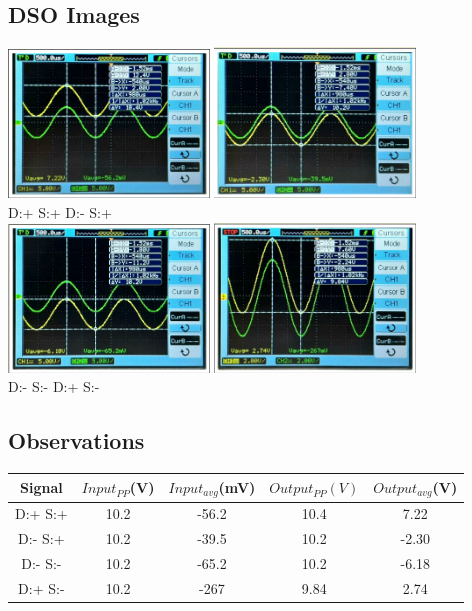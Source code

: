 \documentclass{article}
\begin{document}
\subsection{DSO Images}
\begin{center}
    \includegraphics[width=0.4\textwidth]{pic15.png}
    \includegraphics[width=0.4\textwidth]{pic16.png}\\
    D:+ S:+ \hspace{30mm}D:- S:+\\
    \includegraphics[width=0.4\textwidth]{pic17.png}
    \includegraphics[width=0.4\textwidth]{pic18.png}\\
    D:- S:- \hspace{30mm}D:+ S:-\\
\end{center}
\subsection{Observations}
\begin{center}
\begin{tabular}{|c|c|c|c|c|}
\hline
    Signal & $Input_{PP}$(V) & $Input_{avg}$(mV) & $Output_{PP}(V)$ & $Output_{avg}$(V) \\
    \hline
    D:+ S:+ & 10.2 & -56.2 & 10.4 & 7.22\\
    D:- S:+ & 10.2 & -39.5 & 10.2 & -2.30 \\
    D:- S:- & 10.2 & -65.2 & 10.2 & -6.18\\
    D:+ S:- & 10.2 & -267 & 9.84 & 2.74\\
\hline
\end{tabular}
\end{center}
\end{document}
